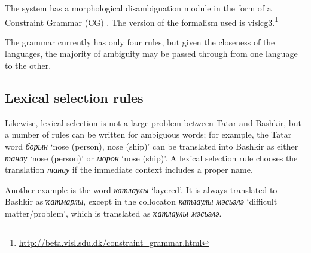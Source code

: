 \documentclass[11pt]{article}
\begin{document}
The system has a morphological disambiguation module in the form of a 
Constraint Grammar (CG) \citep{karlsson95}. The version of the formalism used is 
vislcg3.\footnote{\url{http://beta.visl.sdu.dk/constraint_grammar.html}}

The grammar currently has only four rules, but given the closeness of the languages, the 
majority of ambiguity may be passed through from one language to the other.

\subsection{Lexical selection rules}

Likewise, lexical selection is not a large problem between Tatar and Bashkir, but a 
number of rules can be written for ambiguous words; for example, the Tatar 
word \emph{борын} `nose (person), nose (ship)' can be translated into Bashkir 
as either \emph{танау} `nose (person)' or \emph{морон} `nose (ship)'. A lexical selection
rule chooses the translation \emph{танау} if the immediate context includes a proper 
name.

Another example is the word \emph{катлаулы} `layered'.  It is always translated to Bashkir 
as \emph{{\qipa ҡ}атмарлы}, except in the collocaton \emph{катлаулы мәсьәлә} `difficult matter/problem', which is translated as \emph{{\qipa ҡ}атлаулы мәсьәлә}.

\end{document}

